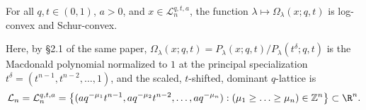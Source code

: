 For all $q,t\in(0,1)$, $a>0$, and $x\in\mathcal L_n^{q,t,a}$, the function $\lambda\mapsto\Omega_\lambda(x;q,t)$ is log-convex and Schur-convex.

Here, by \S2.1 of the same paper, $\Omega_\lambda(x;q,t)=P_\lambda(x;q,t)/P_\lambda(t^\delta;q,t)$ is the Macdonald polynomial normalized to $1$ at the principal specialization $t^\delta=(t^{n-1},t^{n-2},\ldots,1)$, and the scaled, $t$-shifted, dominant $q$-lattice is
\[\mathcal L_n=\mathcal L_n^{q,t,a}=\left\{(aq^{-\mu_1}t^{n-1},aq^{-\mu_2}t^{n-2},\ldots,aq^{-\mu_n}):(\mu_1\ge\ldots\ge\mu_n)\in\mathbb Z^n\right\}\subset\R^n.\]
